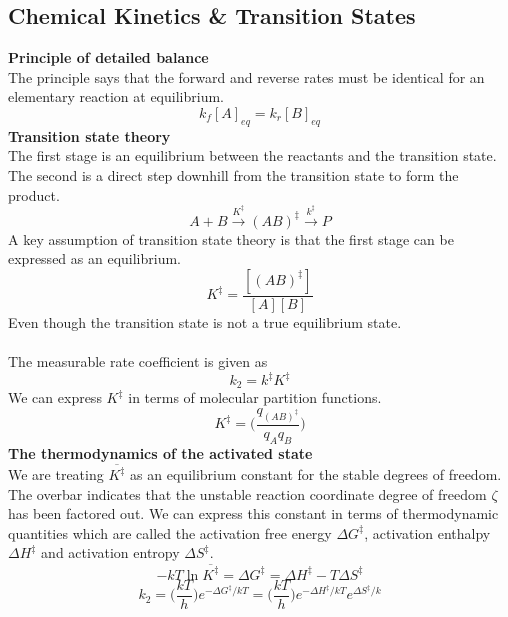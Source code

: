 \documentclass[8pt]{article}
\numberwithin{equation}{section}
\begin{document}
\begin{multicols}{2}
\setcounter{section}{18}
\section{Chemical Kinetics \& Transition States}
\textbf{Principle of detailed balance} \\
The principle says that the forward and reverse rates must be identical for an elementary reaction at equilibrium. 
\begin{equation}
k_{f}[A]_{eq}=k_{r}[B]_{eq} \tag{19.4}
\end{equation}
\textbf{Transition state theory} \\
The first stage is an equilibrium between the reactants and the transition state. The second is a direct step downhill from the transition state to form the product. 
\begin{equation}
A+B\xrightarrow{K^{\ddagger}}(AB)^{\ddagger}\xrightarrow{k^{\ddagger}}P \tag{19.13}
\end{equation}
A key assumption of transition state theory is that the first stage can be expressed as an equilibrium. 
\begin{equation}
K^{\ddagger}=\frac{[(AB)^{\ddagger}]}{[A][B]} \tag{19.14}
\end{equation}
Even though the transition state is not a true equilibrium state. 	\\ \\
The measurable rate coefficient is given as 
\begin{equation}
k_{2}=k^{\ddagger}K^{\ddagger} \tag{19.16}
\end{equation}
We can express $K^{\ddagger}$ in terms of molecular partition functions.
\begin{equation}
K^{\ddagger}=\bigg(\frac{q_{(AB)^{\ddagger}}}{q_{A}q_{B}}\bigg) \tag{19.17}
\end{equation} 
\textbf{The thermodynamics of the activated state}\\
We are treating $\overline{K^{\ddagger}}$ as an equilibrium constant for the stable degrees of freedom. The overbar indicates that the unstable reaction coordinate degree of freedom $\zeta$ has been factored out. We can express this constant in terms of thermodynamic quantities which are called the activation free energy $\Delta G^{\ddagger}$, activation enthalpy $\Delta H^{\ddagger}$ and activation entropy $\Delta S^{\ddagger}$. 
\begin{equation}
-kT\ln{\overline{K^{\ddagger}}}=\Delta G^{\ddagger}=\Delta H^{\ddagger}-T\Delta S^{\ddagger} \tag{19.25}
\end{equation}
\begin{equation}
k_{2}=\bigg(\frac{kT}{h}\bigg)e^{-\Delta G^{\ddagger}/kT}=\bigg(\frac{kT}{h} \bigg)e^{-\Delta H^{\ddagger}/kT}e^{\Delta S^{\ddagger}/k} \tag{19.26}
\end{equation}

\end{multicols}
\end{document}
